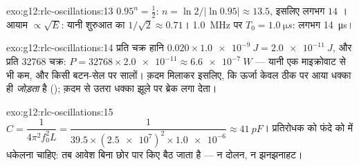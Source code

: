 \begin{solution}{exo:g12:rlc-oscillations:13}
$0.95^n = \tfrac12$: $n = \ln 2/\lvert\ln 0.95\rvert \approx 13.5$, इसलिए लगभग $14$ । आयाम $\propto \sqrt{E}$: यानी
शुरुआत का $1/\sqrt{2} \approx 0.71$। \qty{1.0}{MHz} पर $T_0 = \qty{1.0}{\micro s}$: लगभग \qty{14}{\micro s}।
\end{solution}

\begin{solution}{exo:g12:rlc-oscillations:14}
प्रति चक्र हानि $0.020 \times \qty{1.0e-9}{J} = \qty{2.0e-11}{J}$, और प्रति  \num{32768} चक्र: $P = \num{32768} \times \num{2.0e-11}
\approx \qty{6.6e-7}{W}$ --- यानी एक
माइक्रोवाट से भी कम, और किसी बटन-सेल पर सालों। क़दम मिलाकर इसलिए, कि
ऊर्जा केवल ठीक  पर आया धक्का ही \emph{जोड़ता} है
(); क़दम से उतरा धक्का झूले पर ब्रेक लगा देता।
\end{solution}

\begin{solution}{exo:g12:rlc-oscillations:15}
$C = \dfrac{1}{4\pi^2 f_0^2 L} = \dfrac{1}{39.5 \times
(\num{2.5e7})^2 \times \num{1.0e-6}} \approx \qty{41}{pF}$। प्रतिरोधक को फंदे को  में धकेलना चाहिए: तब
आवेश बिना छोर पार किए बैठ जाता है --- न दोलन, न झनझनाहट।
\end{solution}

